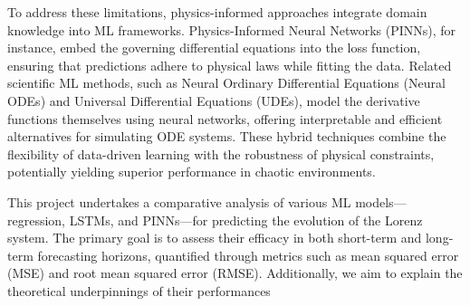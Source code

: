 \documentclass[12pt]{article}
\begin{document}
To address these limitations, physics-informed approaches integrate domain knowledge into ML frameworks. Physics-Informed Neural Networks (PINNs), for instance, embed the governing differential equations into the loss function, ensuring that predictions adhere to physical laws while fitting the data. Related scientific ML methods, such as Neural Ordinary Differential Equations (Neural ODEs) and Universal Differential Equations (UDEs), model the derivative functions themselves using neural networks, offering interpretable and efficient alternatives for simulating ODE systems\cite{kashyap2024modeling}. These hybrid techniques combine the flexibility of data-driven learning with the robustness of physical constraints, potentially yielding superior performance in chaotic environments.

This project undertakes a comparative analysis of various ML models—regression, LSTMs, and PINNs—for predicting the evolution of the Lorenz system. The primary goal is to assess their efficacy in both short-term and long-term forecasting horizons, quantified through metrics such as mean squared error (MSE) and root mean squared error (RMSE). Additionally, we aim to explain the theoretical underpinnings of their performances




\end{document}
